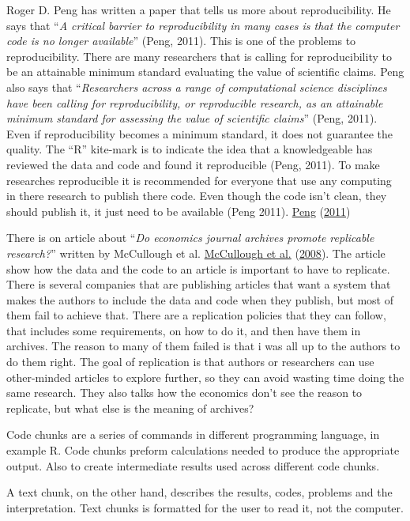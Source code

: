 \documentclass[
  12pt,
  norsk,
]{article}
\begin{document}
Roger D. Peng has written a paper that tells us more about
reproducibility. He says that ``\emph{A critical barrier to
reproducibility in many cases is that the computer code is no longer
available}'' (Peng, 2011). This is one of the problems to
reproducibility. There are many researchers that is calling for
reproducibility to be an attainable minimum standard evaluating the
value of scientific claims. Peng also says that ``\emph{Researchers
across a range of computational science disciplines have been calling
for reproducibility, or reproducible research, as an attainable minimum
standard for assessing the value of scientific claims}'' (Peng, 2011).
Even if reproducibility becomes a minimum standard, it does not
guarantee the quality. The ``R'' kite-mark is to indicate the idea that
a knowledgeable has reviewed the data and code and found it reproducible
(Peng, 2011). To make researches reproducible it is recommended for
everyone that use any computing in there research to publish there code.
Even though the code isn't clean, they should publish it, it just need
to be available (Peng 2011). \protect\hyperlink{ref-peng2011}{Peng}
(\protect\hyperlink{ref-peng2011}{2011})

There is on article about ``\emph{Do economics journal archives promote
replicable research?}'' written by McCullough et al.
\protect\hyperlink{ref-mccullough2008}{McCullough et al.}
(\protect\hyperlink{ref-mccullough2008}{2008}). The article show how the
data and the code to an article is important to have to replicate. There
is several companies that are publishing articles that want a system
that makes the authors to include the data and code when they publish,
but most of them fail to achieve that. There are a replication policies
that they can follow, that includes some requirements, on how to do it,
and then have them in archives. The reason to many of them failed is
that i was all up to the authors to do them right. The goal of
replication is that authors or researchers can use other-minded articles
to explore further, so they can avoid wasting time doing the same
research. They also talks how the economics don't see the reason to
replicate, but what else is the meaning of archives?

Code chunks are a series of commands in different programming language,
in example R. Code chunks preform calculations needed to produce the
appropriate output. Also to create intermediate results used across
different code chunks.

A text chunk, on the other hand, describes the results, codes, problems
and the interpretation. Text chunks is formatted for the user to read
it, not the computer.
\end{document}
